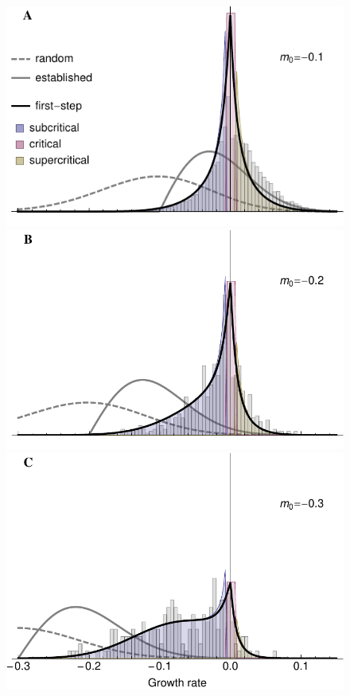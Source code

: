 \documentclass[9pt,twocolumn,twoside,lineno]{gsajnl}
\begin{document}
\begin{figure}[htbp]
\centering
\includegraphics[width=\linewidth]{firststep_smallm0_regimes.pdf}\\
\includegraphics[width=\linewidth]{firststep_medm0_regimes.pdf}\\
\includegraphics[width=\linewidth]{firststep_largem0_regimes.pdf}\\

\end{figure}
\end{document}
